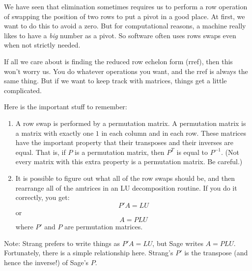 \documentclass[10pt,]{book}
\theoremstyle{plain}
\numberwithin{equation}{section}
\begin{document}
        We have seen that elimination sometimes requires us to perform a row
        operation of swapping the position of two rows to put a pivot in a good
        place. At first, we want to do this to avoid a zero. But for computational
        reasons, a machine really likes to have a \emph{big} number as a pivot.
        So software often uses rows swaps even when not strictly needed.
\par

        If all we care about is finding the reduced row echelon form (rref),
        then this won't worry us. You do whatever operations you want, and the
        rref is always the same thing. But if we want to keep track with matrices,
        things get a little complicated.
\par

        Here is the important stuff to remember:
        \begin{enumerate}
\item{}A row swap is performed by a permutation matrix. A permutation matrix
            is a matrix with exactly one \(1\) in each column and in each row.
            These matrices have the important property that their transposes and
            their inverses are equal. That is, if \(P\) is a permutation matrix,
            then \(P^T\) is equal to \(P^{-1}\). (Not every matrix with
            this extra property is a permutation matrix. Be careful.)
          \item{}
            It is possible to figure out what all of the row swaps should be, and
            then rearrange all of the amtrices in an LU decomposition routine.
            If you do it correctly, you get:
            \[
              P'A = LU
            \]
            or
            \[
              A = PLU
            \]
            where \(P'\) and \(P\) are permutation matrices.
          \end{enumerate}

\par

        Note: Strang prefers to write things as \(P'A = LU\), but Sage writes
        \(A = PLU\). Fortunately, there is a simple relationship here. Strang's
        \(P'\) is the transpose (and hence the inverse!) of Sage's \(P\).
\par
\end{document}
